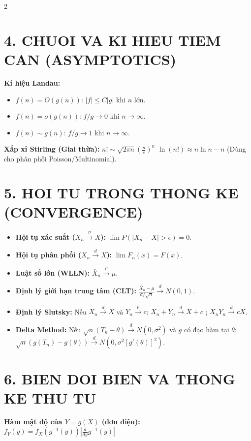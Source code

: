 \documentclass[8pt,a4paper]{article}
\begin{document}
\begin{multicols*}{2}
\section{4. CHUOI VA KI HIEU TIEM CAN (ASYMPTOTICS)}
\textbf{Kí hiệu Landau:}
\begin{itemize}
    \item $f(n) = O(g(n))$: $|f| \leq C|g|$ khi $n$ lớn.
    \item $f(n) = o(g(n))$: $f/g \to 0$ khi $n \to \infty$.
    \item $f(n) \sim g(n)$: $f/g \to 1$ khi $n \to \infty$.
\end{itemize}
\textbf{Xấp xỉ Stirling (Giai thừa):}
$n! \sim \sqrt{2\pi n} \left(\frac{n}{e}\right)^n$
$\ln(n!) \approx n \ln n - n$ (Dùng cho phân phối Poisson/Multinomial).

\columnbreak

\section{5. HOI TU TRONG THONG KE (CONVERGENCE)}
\begin{itemize}
    \item \textbf{Hội tụ xác suất ($X_n \xrightarrow{p} X$):} $\lim P(|X_n - X| > \epsilon) = 0$.
    \item \textbf{Hội tụ phân phối ($X_n \xrightarrow{d} X$):} $\lim F_n(x) = F(x)$.
    \item \textbf{Luật số lớn (WLLN):} $\bar{X}_n \xrightarrow{p} \mu$.
    \item \textbf{Định lý giới hạn trung tâm (CLT):} $\frac{\bar{X}_n - \mu}{\sigma/\sqrt{n}} \xrightarrow{d} N(0, 1)$.
    \item \textbf{Định lý Slutsky:} Nếu $X_n \xrightarrow{d} X$ và $Y_n \xrightarrow{p} c$:
    $X_n + Y_n \xrightarrow{d} X + c$ ; $X_n Y_n \xrightarrow{d} cX$.
    \item \textbf{Delta Method:} Nếu $\sqrt{n}(T_n - \theta) \xrightarrow{d} N(0, \sigma^2)$ và $g$ có đạo hàm tại $\theta$:
    $\sqrt{n}(g(T_n) - g(\theta)) \xrightarrow{d} N(0, \sigma^2 [g'(\theta)]^2)$.
\end{itemize}

\section{6. BIEN DOI BIEN VA THONG KE THU TU}
\textbf{Hàm mật độ của $Y = g(X)$ (đơn điệu):}
$f_Y(y) = f_X(g^{-1}(y)) \left| \frac{d}{dy} g^{-1}(y) \right|$


\end{multicols*}
\end{document}
